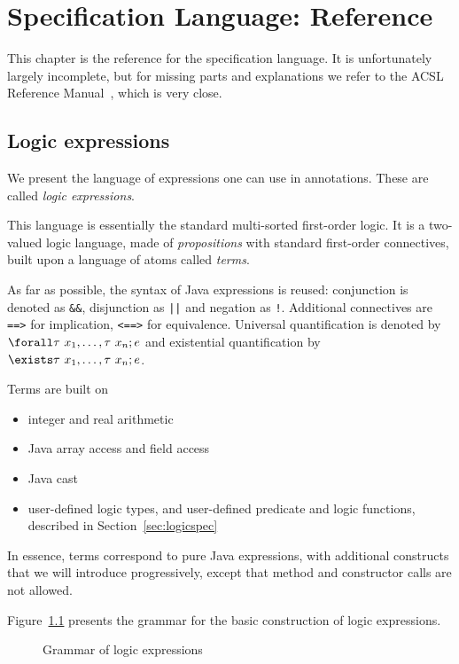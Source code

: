 \documentclass[a4paper,11pt,twoside,openright]{report}
\begin{document}


\chapter{Specification Language: Reference}
\label{chap:reference}

This chapter is the reference for the specification language. It is
unfortunately largely incomplete, but for missing parts and
explanations we refer to the ACSL Reference
Manual~\cite{baudin09acsl}, which is very close.


\section{Logic expressions}
\label{sec:expressions}

We present the language of expressions one can use in
annotations. These are called \emph{logic expressions}.

This language is essentially the standard multi-sorted first-order
logic. It is a two-valued logic language, made of \emph{propositions}
with standard first-order connectives, built upon a language
of atoms called \emph{terms}.

As far as possible, the syntax of Java expressions is reused:
conjunction is denoted as \verb|&&|, disjunction as \verb+||+ and
negation as \verb|!|.  Additional connectives are \verb|==>| for
implication, \verb|<==>| for equivalence. Universal quantification is
denoted by $\bskw{forall} \tau~x_1,\ldots,\tau~x_n; e$ and existential
quantification by $\bskw{exists} \tau~x_1,\ldots,\tau~x_n; e$.

Terms are built on
\begin{itemize}
\item integer and real arithmetic
\item Java array access and field access
\item Java cast
\item user-defined logic types, and user-defined predicate and logic
  functions, described in Section~\ref{sec:logicspec}
\end{itemize}
In essence, terms correspond to pure Java expressions, with additional
constructs that we will introduce progressively, except that method
and constructor calls are not allowed.

Figure~\ref{fig:gram:lexpr} presents the grammar for the basic
construction of logic expressions.

\begin{figure}[p]
  \caption{Grammar of logic expressions}
\label{fig:gram:lexpr}
\end{figure}
\end{document}
